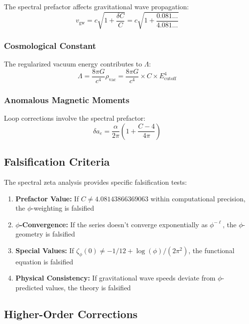 The spectral prefactor affects gravitational wave propagation:
\begin{equation}
v_{\text{gw}} = c \sqrt{1 + \frac{\delta C}{C}} = c \sqrt{1 + \frac{0.081...}{4.081...}}
\end{equation}

\subsubsection{Cosmological Constant}

The regularized vacuum energy contributes to $\Lambda$:
\begin{equation}
\Lambda = \frac{8\pi G}{c^4} \rho_{\text{vac}} = \frac{8\pi G}{c^4} \times C \times E_{\text{cutoff}}^4
\end{equation}

\subsubsection{Anomalous Magnetic Moments}

Loop corrections involve the spectral prefactor:
\begin{equation}
\delta a_e = \frac{\alpha}{2\pi} \left( 1 + \frac{C - 4}{4\pi} \right)
\end{equation}

\subsection{Falsification Criteria}

The spectral zeta analysis provides specific falsification tests:

\begin{enumerate}
\item \textbf{Prefactor Value:} If $C \neq 4.08143866369063$ within computational precision, the $\phi$-weighting is falsified
\item \textbf{$\phi$-Convergence:} If the series doesn't converge exponentially as $\phi^{-\ell}$, the $\phi$-geometry is falsified  
\item \textbf{Special Values:} If $\zeta_\phi(0) \neq -1/12 + \log(\phi)/(2\pi^2)$, the functional equation is falsified
\item \textbf{Physical Consistency:} If gravitational wave speeds deviate from $\phi$-predicted values, the theory is falsified
\end{enumerate}

\subsection{Higher-Order Corrections}

